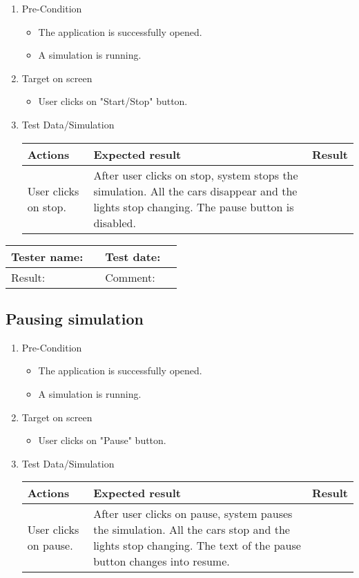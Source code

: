 \begin{enumerate}
	\item Pre-Condition
	\begin{itemize}
		\item The application is successfully opened.
		\item A simulation is running.
	\end{itemize}
	\item Target on screen
	\begin{itemize}
		\item User clicks on "Start/Stop" button.
	\end{itemize}
	\item Test Data/Simulation
	\begin{tabularx}{\textwidth}{|X|X|p{2.5cm}|}\hline
	    Actions & Expected result & Result \\\hline
	    User clicks on stop. & After user clicks on stop, system stops the simulation. All the cars disappear and the lights stop changing. The pause button is disabled. & \pass \\\hline    
	\end{tabularx}
\end{enumerate}

\begin{tabularx}{\textwidth}{|p{3cm}X|p{3cm}X|}\hline
	Tester name: &  & Test date: & \\\hline
	Result: &  \pass & Comment: & \\\hline
\end{tabularx}

\newpage

\subsection{Pausing  simulation}

\begin{enumerate}
	\item Pre-Condition
	\begin{itemize}
		\item The application is successfully opened.
		\item A simulation is running.
	\end{itemize}
	\item Target on screen
	\begin{itemize}
		\item User clicks on "Pause" button.
	\end{itemize}
	\item Test Data/Simulation
	\begin{tabularx}{\textwidth}{|X|X|p{2.5cm}|}\hline
		Actions & Expected result & Result \\\hline
		User clicks on pause. & After user clicks on pause, system pauses the simulation. All the cars stop and the lights stop changing. The text of the pause button changes into resume.
	\end{tabularx}
\end{enumerate}

